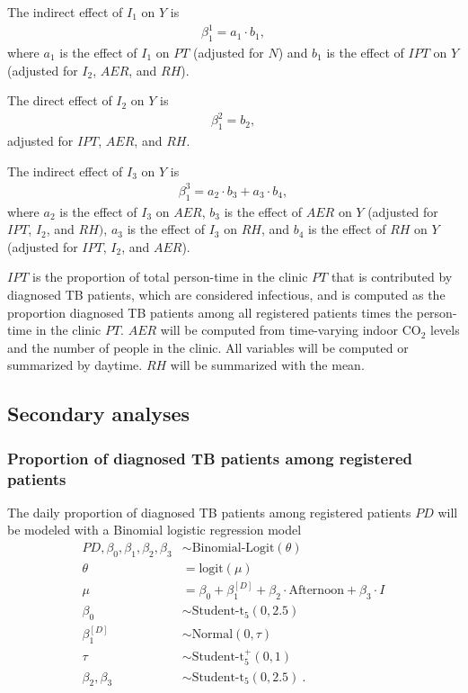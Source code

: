 \documentclass{article}
\begin{document}
The indirect effect of $I_1$ on $Y$ is 
\begin{align*}
    \beta_1^1 = a_1 \cdot b_1,
\end{align*}
where $a_1$ is the effect of $I_1$ on $PT$ (adjusted for $N$) and $b_1$ is the effect of $IPT$ on $Y$ (adjusted for $I_2$, $AER$, and $RH$). 

The direct effect of $I_2$ on $Y$ is
\begin{align*}
    \beta_1^2 = b_2,
\end{align*}
adjusted for $IPT$, $AER$, and $RH$.

The indirect effect of $I_3$ on $Y$ is
\begin{align*}
    \beta_1^3 = a_2 \cdot b_3 + a_3 \cdot b_4,
\end{align*}
where $a_2$ is the effect of $I_3$ on $AER$, $b_3$ is the effect of $AER$ on $Y$ (adjusted for $IPT$, $I_2$, and $RH)$, $a_3$ is the effect of $I_3$ on $RH$, and $b_4$ is the effect of $RH$ on $Y$ (adjusted for $IPT$, $I_2$, and $AER$).

$IPT$ is the proportion of total person-time in the clinic $PT$ that is contributed by diagnosed TB patients, which are considered infectious, and is computed as the proportion diagnosed TB patients among all registered patients times the person-time in the clinic $PT$. $AER$ will be computed from time-varying indoor CO$_2$ levels and the number of people in the clinic. All variables will be computed or summarized by daytime. $RH$ will be summarized with the mean. 


\subsection{Secondary analyses}

\subsubsection{Proportion of diagnosed TB patients among registered patients}

The daily proportion of diagnosed TB patients among registered patients $PD$ will be modeled with a Binomial logistic regression model
\begin{align*}
    PD, \beta_0, \beta_1, \beta_2, \beta_3 &\sim \text{Binomial-Logit}(\theta) \\
    \theta &= \text{logit}(\mu) \\
    \mu &= \beta_0 + \beta_1^{[D]} + \beta_2 \cdot \text{Afternoon} + \beta_3 \cdot I \\
    \beta_0 &\sim \text{Student-t}_5(0, 2.5) \\
    \beta_1^{[D]} &\sim \text{Normal}(0, \tau) \\
    \tau &\sim \text{Student-t}_5^{+}(0, 1) \\
    \beta_2, \beta_3 &\sim \text{Student-t}_5\left(0, 2.5\right)~.
\end{align*}
\end{document}
